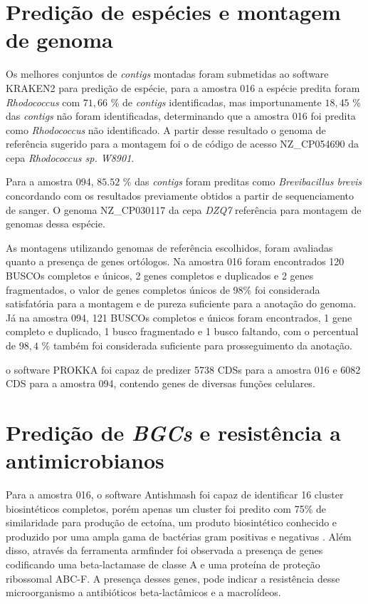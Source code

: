 \section{Predição de espécies e montagem de genoma}

Os melhores conjuntos de \textit{contigs} montadas foram submetidas ao software KRAKEN2 para predição de espécie,
para a amostra 016 a espécie predita foram \textit{Rhodococcus} com $71,66$ \% de \textit{contigs} identificadas, mas importunamente
$18,45$ \% das \textit{contigs} não foram identificadas, determinando que a amostra 016 foi predita como \textit{Rhodococcus}
não identificado. A partir desse resultado o genoma de referência sugerido para a montagem foi o de código
de acesso NZ\_CP054690 da cepa \textit{Rhodococcus sp. W8901}. 

Para a amostra 094, $85.52$ \% das \textit{contigs} foram preditas como \textit{Brevibacillus brevis}
concordando com os resultados previamente obtidos a partir de sequenciamento de sanger. O genoma NZ\_CP030117
da cepa \textit{DZQ7} referência para montagem de genomas dessa espécie.

As montagens utilizando genomas de referência escolhidos, foram avaliadas quanto a presença de genes 
ortólogos. Na amostra 016 foram encontrados 120 BUSCOs completos e únicos, 2 genes completos e duplicados e 2 genes fragmentados,
 o valor de genes completos únicos de 98\% foi considerada satisfatória para a montagem e de pureza suficiente para
a anotação do genoma. Já na amostra 094, 121 BUSCOs completos e únicos foram encontrados, 1 gene completo e duplicado, 1 busco fragmentado
e 1 busco faltando, com o percentual de $98,4$ \% também foi considerada suficiente para prosseguimento da anotação.

o software PROKKA foi capaz de predizer 5738 CDSs para a amostra 016 e 6082 CDS para a amostra 094, contendo genes
de diversas funções celulares. 

\section{Predição de \textit{BGCs} e resistência a antimicrobianos}

Para a amostra 016, o software Antishmash foi capaz de identificar 16 cluster biosintéticos completos, porém
apenas um cluster foi predito com 75\% de similaridade para produção de ectoína, um produto biosintético
conhecido e produzido por uma ampla gama de bactérias gram positivas e negativas \cite{toveken2011specialized}.
Além disso, através da ferramenta armfinder foi observada a presença de genes codificando uma beta-lactamase de classe A e uma proteína de
proteção ribossomal ABC-F. A presença desses genes, pode indicar a resistência desse microorganismo a antibióticos beta-lactâmicos
e a macrolídeos.  

